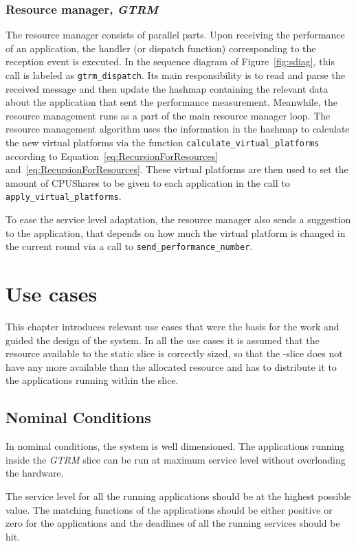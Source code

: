 \documentclass[nobiblatex]{LTHthesis}
\begin{document}
\subsection{Resource manager, \emph{GTRM}}
The resource manager consists of parallel parts. Upon receiving the
performance of an application, the handler (or dispatch function)
corresponding to the reception event is executed. In the sequence diagram of
Figure~\ref{fig:sdiag}, this call is labeled as \texttt{gtrm\_dispatch}.
Its main responsibility is to read and parse the received message and 
then update the hashmap containing the relevant data about the application
that sent the performance measurement. Meanwhile, the resource management 
runs as a part of the main resource manager loop. The resource management
algorithm uses the information in the hashmap to calculate the new virtual
platforms via the function \texttt{calculate\_virtual\_platforms} according
to Equation~\eqref{eq:RecursionForResources} and~\eqref{eq:RecursionForResources}.
These virtual platforms are then used to set the amount of CPUShares to
be given to each application in the call to \texttt{apply\_virtual\_platforms}.

To ease the service level adaptation, the resource manager also sends a
suggestion to the application, that depends on how much the virtual platform
is changed in the current round via a call to 
\texttt{send\_performance\_number}.

\chapter{Use cases}
\label{chp:usecases}

This chapter introduces relevant use cases that were the basis for the
work and guided the design of the system. In all the use cases it is assumed
that the resource available to the static slice is correctly sized, so that
the -slice does not have any more available than the allocated resource
and has to distribute it to the applications running within the slice.

\section{Nominal Conditions}

In nominal conditions, the system is well dimensioned. The applications
running inside the \emph{GTRM} slice can be run at maximum service level without 
overloading the hardware.

The service level for all the running applications should be at the
highest possible value. The matching functions of the applications should
be either positive or zero for the applications and the deadlines of all
the running services should be hit.
\end{document}
